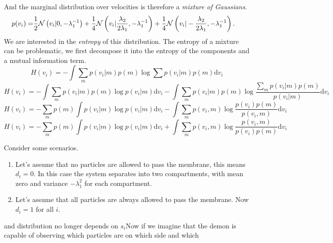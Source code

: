 \documentclass[
]{article}
\newenvironment{Shaded}{}{}
\begin{document}
And the marginal distribution over velocities is therefore a
\emph{mixture of Gaussians}. \[
\begin{align*}
p(v_i) = & \frac{1}{2}\mathcal{N}\left(v_i|0, -\lambda_1^{-1}\right) 
 + \frac{1}{4}\mathcal{N}\left(v_i|\frac{\lambda_2}{2\lambda_1}, -\lambda_1^{-1}\right)
 + \frac{1}{4}\mathcal{N}\left(v_i|-\frac{\lambda_2}{2\lambda_1}, -\lambda_1^{-1}\right).
\end{align*}
\] We are interested in the \emph{entropy} of this distribution. The
entropy of a mixture can be problematic, we first decompose it into the
entropy of the components and a mutual information term. \[
H(v_i) =  - \int \sum_m p(v_i | m) p(m) \log \sum p(v_i | m) p(m) \text{d}v_i
\] \[
H(v_i) =  - \int \sum_m p(v_i | m) p(m) \log p(v_i | m)  \text{d}v_i - \int \sum_m p(v_i | m) p(m) \log \frac{\sum_m p(v_i | m) p(m)}{p(v_i | m)}  \text{d}v_i
\] \[
H(v_i) =  - \sum_m  p(m)\int p(v_i | m) \log p(v_i | m)  \text{d}v_i - \int \sum_m p(v_i , m) \log \frac{p(v_i) p(m)}{p(v_i,m)}  \text{d}v_i
\] \[
H(v_i) =  - \sum_m  p(m)\int p(v_i | m) \log p(v_i | m)  \text{d}v_i + \int \sum_m p(v_i , m) \log \frac{p(v_i,m)}{p(v_i) p(m)}  \text{d}v_i
\]

Consider some scenarios.

\begin{enumerate}
\item
  Let's assume that no particles are allowed to pass the membrane, this
  means \(d_i=0\). In this case the system separates into two
  compartments, with mean zero and variance \(-\lambda_1^2\) for each
  compartment.
\item
  Let's assume that all particles are always allowed to pass the
  membrane. Now \(d_i=1\) for all \(i\).
\end{enumerate}

and distribution no longer depends on \(s_i\)Now if we imagine that the
demon is capable of observing which particles are on which side and
which

\begin{Shaded}
\begin{Highlighting}[]

\end{Highlighting}
\end{Shaded}
\end{document}
